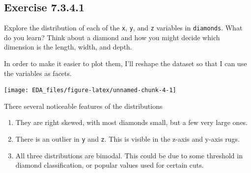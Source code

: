 \documentclass[]{book}
\newenvironment{Shaded}{\begin{snugshade}}{\end{snugshade}}
\newcommand{\DataTypeTok}[1]{\textcolor[rgb]{0.13,0.29,0.53}{#1}}
\newcommand{\KeywordTok}[1]{\textcolor[rgb]{0.13,0.29,0.53}{\textbf{#1}}}
\newcommand{\NormalTok}[1]{#1}
\newcommand{\OperatorTok}[1]{\textcolor[rgb]{0.81,0.36,0.00}{\textbf{#1}}}
\newcommand{\StringTok}[1]{\textcolor[rgb]{0.31,0.60,0.02}{#1}}
\theoremstyle{plain}
\theoremstyle{remark}
\begin{document}
\hypertarget{exercise-7.3.4.1}{%
\subsection*{\texorpdfstring{Exercise {7.3.4.1}}{Exercise 7.3.4.1}}\label{exercise-7.3.4.1}}

Explore the distribution of each of the \texttt{x}, \texttt{y}, and \texttt{z} variables in \texttt{diamonds}. What do you learn? Think about a diamond and how you might decide which dimension is the length, width, and depth.

In order to make it easier to plot them, I'll reshape the dataset so that I can use the variables as facets.

\begin{Shaded}
\end{Shaded}

\begin{center}\texttt{[image: EDA\_files/figure-latex/unnamed-chunk-4-1]} \end{center}

There several noticeable features of the distributions

\begin{enumerate}
\def\labelenumi{\arabic{enumi}.}
\item
  They are right skewed, with most diamonds small, but a few very large ones.
\item
  There is an outlier in \texttt{y} and \texttt{z}. This is visible in the z-axis and y-axis rugs.
\item
  All three distributions are bimodal.
  This could be due to some threshold in diamond classification,
  or popular values used for certain cuts.
\end{enumerate}
\end{document}

